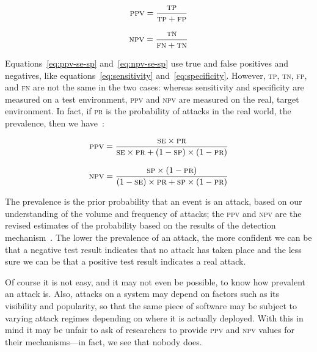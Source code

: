 \documentclass[conference]{IEEEtran}
\begin{document}
\begin{equation}
\textsc{ppv} = \frac{\textsc{tp}}{\textsc{tp} + \textsc{fp}}
\end{equation}

\begin{equation}
\textsc{npv} = \frac{\textsc{tn}}{\textsc{fn} + \textsc{tn}}
\end{equation}

\noindent
Equations~\ref{eq:ppv-se-sp} and~\ref{eq:npv-se-sp} use true and false
positives and negatives, like equations~\ref{eq:sensitivity}
and~\ref{eq:specificity}. However, \textsc{tp}, \textsc{tn},
\textsc{fp}, and \textsc{fn} are not the same in the two cases:
whereas sensitivity and specificity are measured on a test
environment, \textsc{ppv} and \textsc{npv} are measured on the real,
target environment. In fact, if \textsc{pr} is the probability of
attacks in the real world, the prevalence, then we
have~\cite{linn2004,altman1994}:

\begin{equation}
\textsc{ppv} = \frac{\textsc{se}\times \textsc{pr}}{
\textsc{se}\times \textsc{pr} + (1 - \textsc{sp})\times (1 -
\textsc{pr})}
\label{eq:ppv-se-sp}
\end{equation}

\begin{equation}
\textsc{npv} = \frac{\textsc{sp}\times (1 - \textsc{pr})}{
(1 - \textsc{se})\times \textsc{pr} + \textsc{sp}\times (1 -
\textsc{pr})}
\label{eq:npv-se-sp}
\end{equation}

\noindent
The prevalence is the prior probability that an event is an attack,
based on our understanding of the volume and frequency of attacks; the
\textsc{ppv} and \textsc{npv} are the revised estimates of the
probability based on the results of the detection
mechanism~\cite{altman1994}. The lower the prevalence of an attack,
the more confident we can be that a negative test result indicates
that no attack has taken place and the less sure we can be that a
positive test result indicates a real attack. 

Of course it is not easy, and it may not even be possible, to know how
prevalent an attack is. Also, attacks on a system may depend on
factors such as its visibility and popularity, so that the same piece
of software may be subject to varying attack regimes depending on
where it is actually deployed. With this in mind it may be unfair to
ask of researchers to provide \textsc{ppv} and \textsc{npv} values for
their mechanisms---in fact, we see that nobody does.
\end{document}
